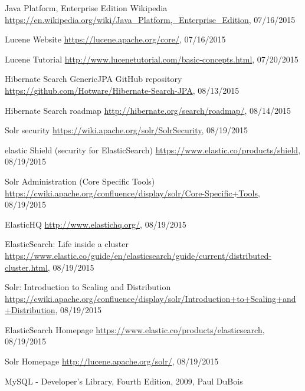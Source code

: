 \begin{thebibliography}{99}
	Java Platform, Enterprise Edition
	Wikipedia
	\url{https://en.wikipedia.org/wiki/Java_Platform,_Enterprise_Edition}, 07/16/2015
	
	Lucene Website
	\url{https://lucene.apache.org/core/}, 07/16/2015
	
	Lucene Tutorial
	\url{http://www.lucenetutorial.com/basic-concepts.html}, 07/20/2015
	
	Hibernate Search GenericJPA GitHub repository
	\url{https://github.com/Hotware/Hibernate-Search-JPA}, 08/13/2015
	
	Hibernate Search roadmap
	\url{http://hibernate.org/search/roadmap/}, 08/14/2015
	
	Solr security
	\url{https://wiki.apache.org/solr/SolrSecurity}, 08/19/2015
	
	elastic Shield (security for ElasticSearch)
	\url{https://www.elastic.co/products/shield}, 08/19/2015
	
	Solr Administration (Core Specific Tools)
	\url{https://cwiki.apache.org/confluence/display/solr/Core-Specific+Tools}, 08/19/2015
	
	ElasticHQ
	\url{http://www.elastichq.org/}, 08/19/2015
	
	ElasticSearch: Life inside a cluster
	\url{https://www.elastic.co/guide/en/elasticsearch/guide/current/distributed-cluster.html}, 08/19/2015
	
	Solr: Introduction to Scaling and Distribution
	\url{https://cwiki.apache.org/confluence/display/solr/Introduction+to+Scaling+and+Distribution}, 08/19/2015
	
	ElasticSearch Homepage
	\url{https://www.elastic.co/products/elasticsearch}, 08/19/2015
	
	Solr Homepage
	\url{http://lucene.apache.org/solr/}, 08/19/2015
	
	MySQL - Developer's Library, Fourth Edition, 2009, Paul DuBois
\end{thebibliography}